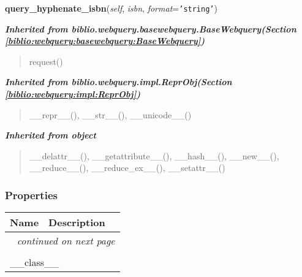     \label{biblio:webquery:xisbn:XisbnQuery:query_hyphenate_isbn}

    \vspace{0.5ex}

\hspace{.8\funcindent}\begin{boxedminipage}{\funcwidth}

    \raggedright \textbf{query\_hyphenate\_isbn}(\textit{self}, \textit{isbn}, \textit{format}={\tt \texttt{'}\texttt{string}\texttt{'}})

\setlength{\parskip}{2ex}
\setlength{\parskip}{1ex}
    \end{boxedminipage}


\large{\textbf{\textit{Inherited from biblio.webquery.basewebquery.BaseWebquery\textit{(Section \ref{biblio:webquery:basewebquery:BaseWebquery})}}}}

\begin{quote}
request()
\end{quote}

\large{\textbf{\textit{Inherited from biblio.webquery.impl.ReprObj\textit{(Section \ref{biblio:webquery:impl:ReprObj})}}}}

\begin{quote}
\_\_repr\_\_(), \_\_str\_\_(), \_\_unicode\_\_()
\end{quote}

\large{\textbf{\textit{Inherited from object}}}

\begin{quote}
\_\_delattr\_\_(), \_\_getattribute\_\_(), \_\_hash\_\_(), \_\_new\_\_(), \_\_reduce\_\_(), \_\_reduce\_ex\_\_(), \_\_setattr\_\_()
\end{quote}


  \subsubsection{Properties}

    \vspace{-1cm}
\hspace{\varindent}\begin{longtable}{|p{\varnamewidth}|p{\vardescrwidth}|l}
\cline{1-2}
\cline{1-2} \centering \textbf{Name} & \centering \textbf{Description}& \\
\cline{1-2}
\endhead\cline{1-2}\multicolumn{3}{r}{\small\textit{continued on next page}}\\\endfoot\cline{1-2}
\endlastfoot\multicolumn{2}{|l|}{\textit{Inherited from object}}\\
\multicolumn{2}{|p{\varwidth}|}{\raggedright \_\_class\_\_}\\
\cline{1-2}
\end{longtable}


